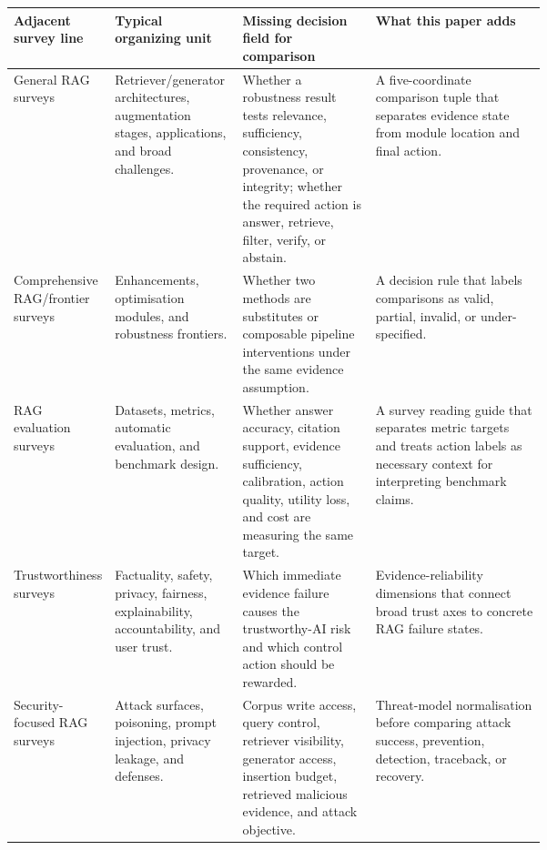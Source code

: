 \begin{table}[t]
\centering
\scriptsize
\renewcommand{\arraystretch}{0.9}
\begin{tabularx}{\linewidth}{>{\raggedright\arraybackslash}p{0.19\linewidth}>{\raggedright\arraybackslash}p{0.24\linewidth}>{\raggedright\arraybackslash}p{0.25\linewidth}X}
\toprule
\textbf{Adjacent survey line} & \textbf{Typical organizing unit} & \textbf{Missing decision field for comparison} & \textbf{What this paper adds} \\
\midrule
General RAG surveys \citep{ragSurvey2024} & Retriever/generator architectures, augmentation stages, applications, and broad challenges. & Whether a robustness result tests relevance, sufficiency, consistency, provenance, or integrity; whether the required action is answer, retrieve, filter, verify, or abstain. & A five-coordinate comparison tuple that separates evidence state from module location and final action. \\
Comprehensive RAG/frontier surveys \citep{ragComprehensive2025} & Enhancements, optimisation modules, and robustness frontiers. & Whether two methods are substitutes or composable pipeline interventions under the same evidence assumption. & A decision rule that labels comparisons as valid, partial, invalid, or under-specified. \\
RAG evaluation surveys \citep{ragEvaluationSurvey2024} & Datasets, metrics, automatic evaluation, and benchmark design. & Whether answer accuracy, citation support, evidence sufficiency, calibration, action quality, utility loss, and cost are measuring the same target. & A survey reading guide that separates metric targets and treats action labels as necessary context for interpreting benchmark claims. \\
Trustworthiness surveys \citep{trustRAGCompass2024,trustworthyRAGSurvey2025} & Factuality, safety, privacy, fairness, explainability, accountability, and user trust. & Which immediate evidence failure causes the trustworthy-AI risk and which control action should be rewarded. & Evidence-reliability dimensions that connect broad trust axes to concrete RAG failure states. \\
Security-focused RAG surveys \citep{securityRAGSurvey2026} & Attack surfaces, poisoning, prompt injection, privacy leakage, and defenses. & Corpus write access, query control, retriever visibility, generator access, insertion budget, retrieved malicious evidence, and attack objective. & Threat-model normalisation before comparing attack success, prevention, detection, traceback, or recovery. \\

\end{tabularx}
\end{table}
